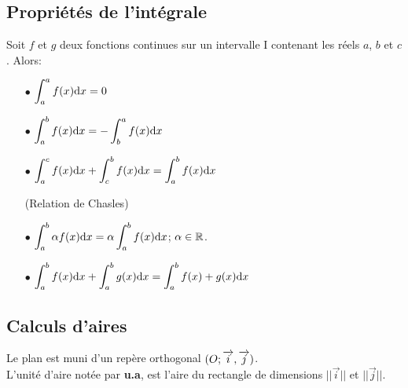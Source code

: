   \subsection*{Propriétés  de l'intégrale}
  \begin{property}
 Soit $f$  et $g$ deux fonctions continues sur un intervalle I contenant les réels  $a $, $b  $  et $c $. Alors:     
 \begin{itemize}
  \item[$  \bullet$]  $ \displaystyle\int_{a}^{a}f(x){\rm d}x =0$ 
  \item[$  \bullet$] $ \displaystyle\int_{a}^{b}f(x){\rm d}x = -\displaystyle\int_{b}^{a}f(x){\rm d}x$
  \item[$  \bullet$] $ \displaystyle\int_{a}^{c}f(x){\rm d}x +\displaystyle\int_{c}^{b}f(x){\rm d}x=\displaystyle\int_{a}^{b}f(x){\rm d}x$\;
  
  (Relation de Chasles)
\item[$  \bullet$]   $ \displaystyle\int_{a}^{b}\alpha f(x){\rm d}x =\alpha\displaystyle\int_{a}^{b}f(x){\rm d}x$;\; $\alpha\in\mathbb{R}$.
   \item[$  \bullet$] $ \displaystyle\int_{a}^{b}f(x){\rm d}x +\displaystyle\int_{a}^{b}g(x){\rm d}x=\displaystyle\int_{a}^{b}f(x)+g(x){\rm d}x$
 
\end{itemize}


 \end{property}
 

 
 \subsection{Calculs d'aires}

Le plan est muni d'un repère orthogonal  $ (O ;\overrightarrow{i},\overrightarrow{j}) $. \\ L'unité d'aire notée par \textbf{u.a},\;  est l'aire du rectangle de dimensions     $ ||\overrightarrow{i}|| $  et   $ ||\overrightarrow{j}|| $.



